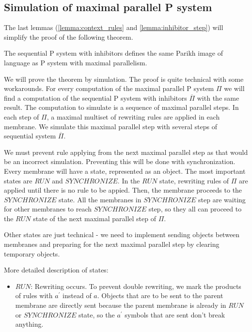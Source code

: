 \subsection{Simulation of maximal parallel P system} %
\label{sub:simulation_of_maximal_parallel_p_system}

The last lemmas (\ref{lemma:context_rules} and \ref{lemma:inhibitor_step}) will simplify the proof of the following theorem.

\begin{veta}
  The sequential P system with inhibitors defines the same Parikh image of language as P system with maximal parallelism.
\end{veta}

\begin{dokaz}
  We will prove the theorem by simulation.
  The proof is quite technical with some workarounds.
  For every computation of the maximal parallel P system $\Pi$ we will find a computation of the sequential P system with inhibitors $\overline{\Pi}$ with the same result.
  The computation to simulate is a sequence of maximal parallel steps.
  In each step of $\Pi$, a maximal multiset of rewriting rules are applied in each membrane.
  We simulate this maximal parallel step with several steps of sequential system $\overline{\Pi}$.

  We must prevent rule applying from the next maximal parallel step as that would be an incorrect simulation.
  Preventing this will be done with synchronization.
  Every membrane will have a state, represented as an object.
  The most important states are $RUN$ and $SYNCHRONIZE$.
  In the $RUN$ state, rewriting rules of $\Pi$ are applied until there is no rule to be appied. Then, the membrane proceeds to the $SYNCHRONIZE$ state.
  All the membranes in $SYNCHRONIZE$ step are waiting for other membranes to reach $SYNCHRONIZE$ step, so they all can proceed to the $RUN$ state of the next maximal parallel step of $\Pi$.

  Other states are just technical - we need to implement sending objects between membranes and preparing for the next maximal parallel step by clearing temporary objects.

  More detailed description of states:
  

  \begin{itemize}
    \item $RUN$: Rewriting occurs.
    To prevent double rewriting, we mark the products of rules with $a^{\prime}$ instead of $a$.
    Objects that are to be sent to the parent membrane are directly sent because the parent membrane is already in $RUN$ or $SYNCHRONIZE$ state, so the $a^{\prime}$ symbols that are sent don't break anything.
    

\end{itemize}
\end{dokaz}
